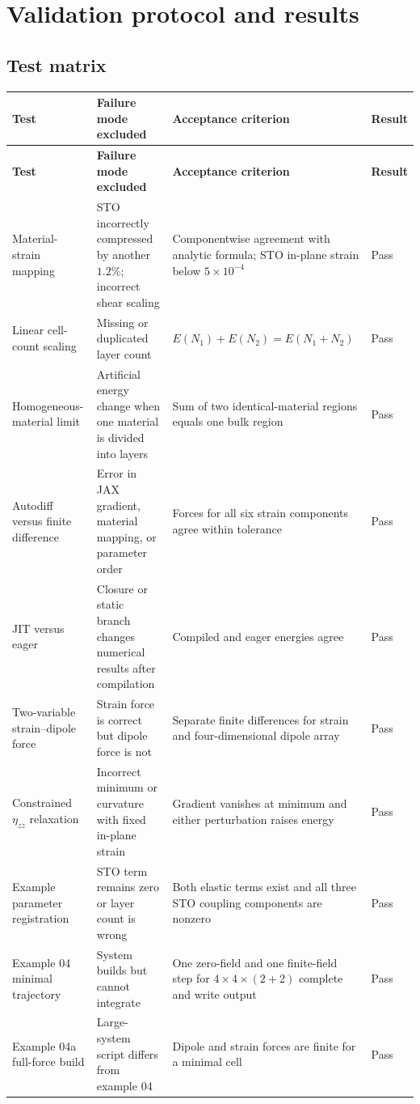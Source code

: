 \documentclass[11pt,a4paper]{article}
\begin{document}
\section{Validation protocol and results}

\subsection{Test matrix}
\small
\begin{longtable}{L{3.25cm}L{4.0cm}L{5.1cm}L{1.5cm}}
\toprule
\textbf{Test} & \textbf{Failure mode excluded} & \textbf{Acceptance criterion} & \textbf{Result}\\
\midrule
\endfirsthead
\toprule
\textbf{Test} & \textbf{Failure mode excluded} & \textbf{Acceptance criterion} & \textbf{Result}\\
\midrule
\endhead
Material-strain mapping & STO incorrectly compressed by another $1.2\%$; incorrect shear scaling & Componentwise agreement with analytic formula; STO in-plane strain below $5\times10^{-4}$ & Pass\\
Linear cell-count scaling & Missing or duplicated layer count & $E(N_1)+E(N_2)=E(N_1+N_2)$ & Pass\\
Homogeneous-material limit & Artificial energy change when one material is divided into layers & Sum of two identical-material regions equals one bulk region & Pass\\
Autodiff versus finite difference & Error in JAX gradient, material mapping, or parameter order & Forces for all six strain components agree within tolerance & Pass\\
JIT versus eager & Closure or static branch changes numerical results after compilation & Compiled and eager energies agree & Pass\\
Two-variable strain--dipole force & Strain force is correct but dipole force is not & Separate finite differences for strain and four-dimensional dipole array & Pass\\
Constrained $\eta_{zz}$ relaxation & Incorrect minimum or curvature with fixed in-plane strain & Gradient vanishes at minimum and either perturbation raises energy & Pass\\
Example parameter registration & STO term remains zero or layer count is wrong & Both elastic terms exist and all three STO coupling components are nonzero & Pass\\
Example 04 minimal trajectory & System builds but cannot integrate & One zero-field and one finite-field step for $4\times4\times(2+2)$ complete and write output & Pass\\
Example 04a full-force build & Large-system script differs from example 04 & Dipole and strain forces are finite for a minimal cell & Pass\\
\bottomrule
\end{longtable}
\normalsize
\end{document}
